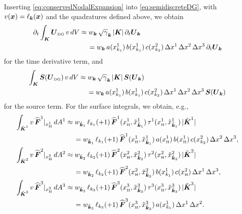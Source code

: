\documentclass[10pt,preprint]{aastex}
\newcommand{\dx}{\Delta x}
\begin{document}
Inserting \eqref{eq:conservedNodalExpansion} into \eqref{eq:semidiscreteDG}, with $v(\boldsymbol{x})=\ell_{\boldsymbol{k}}(\boldsymbol{x})$ and the quadratures defined above, we obtain
\begin{align}
  \pd{}{t}\int_{\bK}\bU_{\DG}\,v\,dV
  &\approx w_{\bk}\,\sqrt{\gamma}_{\bk}\,|\bK|\,\pd{}{t}\bU_{\bk} \nonumber \\
  &\hspace{12pt}
  =w_{\bk}\,a(x_{k_{1}}^{1})\,b(x_{k_{1}}^{1})\,c(x_{k_{2}}^{2})\,\dx^{1}\,\dx^{2}\,\dx^{3}\,\pd{}{t}\bU_{\bk}
\end{align}
for the time derivative term, and
\begin{align}
  \int_{\bK}\bS(\bU_{\DG})\,v\,dV
  &\approx w_{\bk}\,\sqrt{\gamma}_{\bk}\,|\bK|\,\bS(\bU_{\bk}) \nonumber \\
  &\hspace{12pt}
  =w_{\bk}\,a(x_{k_{1}}^{1})\,b(x_{k_{1}}^{1})\,c(x_{k_{2}}^{2})\,\dx^{1}\,\dx^{2}\,\dx^{3}\,\bS(\bU_{\bk})
\end{align}
for the source term.  
For the surface integrals, we obtain, e.g., 
\begin{align}
  \int_{\tilde{\bK}^{1}}v\,\widehat{\bF}^{1}|_{x_{\Hgh}^{1}}\,dA^{1}
  &\approx w_{\tilde{\bk}_{1}}\,\ell_{k_{1}}(+1)\,\widehat{\bF}^{1}(x_{\Hgh}^{1},\tilde{x}_{\tilde{\bk}_{1}}^{1})\,
  \tau^{1}(x_{\Hgh}^{1},\tilde{x}_{\tilde{\bk}_{1}}^{1})\,|\tilde{\bK}^{1}| \nonumber \\
  &\hspace{12pt}
  =w_{\tilde{\bk}_{1}}\,\ell_{k_{1}}(+1)\,\widehat{\bF}^{1}(x_{\Hgh}^{1},\tilde{x}_{\tilde{\bk}_{1}}^{1})\,
  a(x_{\Hgh}^{1})\,b(x_{\Hgh}^{1})\,c(x_{k_{2}}^{2})\,\dx^{2}\,\dx^{3}, \\
  \int_{\tilde{\bK}^{2}}v\,\widehat{\bF}^{2}|_{x_{\Hgh}^{2}}\,dA^{2}
  &\approx w_{\tilde{\bk}_{2}}\,\ell_{k_{2}}(+1)\,\widehat{\bF}^{2}(x_{\Hgh}^{2},\tilde{x}_{\tilde{\bk}_{2}}^{2})\,
  \tau^{2}(x_{\Hgh}^{2},\tilde{x}_{\tilde{\bk}_{2}}^{2})\,|\tilde{\bK}^{2}| \nonumber \\
  &\hspace{12pt}
  =w_{\tilde{\bk}_{2}}\,\ell_{k_{2}}(+1)\,\widehat{\bF}^{2}(x_{\Hgh}^{2},\tilde{x}_{\tilde{\bk}_{2}}^{2})\,
  b(x_{k_{1}}^{1})\,c(x_{\Hgh}^{2})\,\dx^{1}\,\dx^{3}, \\
  \int_{\tilde{\bK}^{3}}v\,\widehat{\bF}^{3}|_{x_{\Hgh}^{3}}\,dA^{3}
  &\approx w_{\tilde{\bk}_{3}}\,\ell_{k_{3}}(+1)\,\widehat{\bF}^{3}(x_{\Hgh}^{3},\tilde{x}_{\tilde{\bk}_{3}}^{3})\,
  \tau^{3}(x_{\Hgh}^{3},\tilde{x}_{\tilde{\bk}_{3}}^{3})\,|\tilde{\bK}^{3}| \nonumber \\
  &\hspace{12pt}
  =w_{\tilde{\bk}_{3}}\,\ell_{k_{3}}(+1)\,\widehat{\bF}^{3}(x_{\Hgh}^{3},\tilde{x}_{\tilde{\bk}_{3}}^{3})\,
  a(x_{k_{1}}^{1})\,\dx^{1}\,\dx^{2}.  
\end{align}
\end{document}
